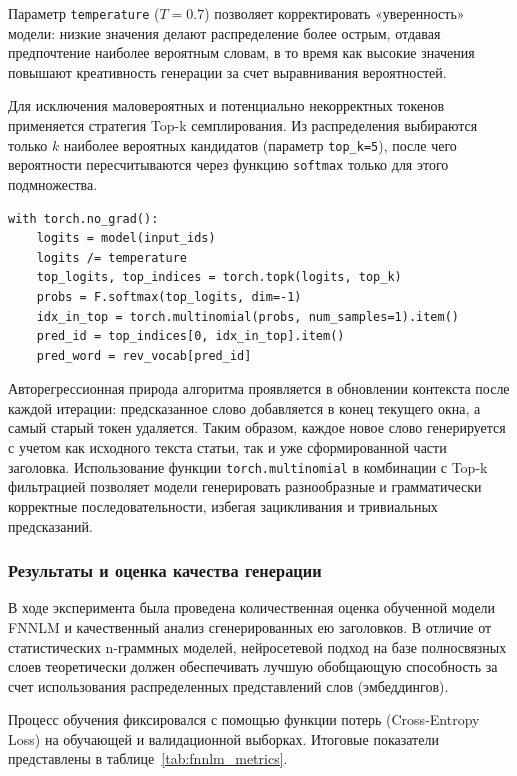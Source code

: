 \documentclass[coursework]{SCWorks}
\begin{document}
    Параметр \texttt{temperature} ($T=0.7$) позволяет корректировать «уверенность» модели: низкие значения делают распределение более острым, отдавая предпочтение наиболее вероятным словам, в то время как высокие значения повышают креативность генерации за счет выравнивания вероятностей.

    Для исключения маловероятных и потенциально некорректных токенов применяется стратегия Top-k семплирования. Из распределения выбираются только $k$ наиболее вероятных кандидатов (параметр \texttt{top\_k=5}), после чего вероятности пересчитываются через функцию \texttt{softmax} только для этого подмножества.

    \begin{verbatim}
with torch.no_grad():
    logits = model(input_ids)
    logits /= temperature
    top_logits, top_indices = torch.topk(logits, top_k)
    probs = F.softmax(top_logits, dim=-1)
    idx_in_top = torch.multinomial(probs, num_samples=1).item()
    pred_id = top_indices[0, idx_in_top].item()
    pred_word = rev_vocab[pred_id]
    \end{verbatim}

    Авторегрессионная природа алгоритма проявляется в обновлении контекста после каждой итерации: предсказанное слово добавляется в конец текущего окна, а самый старый токен удаляется. Таким образом, каждое новое слово генерируется с учетом как исходного текста статьи, так и уже сформированной части заголовка. Использование функции \texttt{torch.multinomial} в комбинации с Top-k фильтрацией позволяет модели генерировать разнообразные и грамматически корректные последовательности, избегая зацикливания и тривиальных предсказаний.

    \subsubsection{Результаты и оценка качества генерации}

    В ходе эксперимента была проведена количественная оценка обученной модели FNNLM и качественный анализ сгенерированных ею заголовков. В отличие от статистических n-граммных моделей, нейросетевой подход на базе полносвязных слоев теоретически должен обеспечивать лучшую обобщающую способность за счет использования распределенных представлений слов (эмбеддингов).

    Процесс обучения фиксировался с помощью функции потерь (Cross-Entropy Loss) на обучающей и валидационной выборках. Итоговые показатели представлены в таблице~\ref{tab:fnnlm_metrics}.
\end{document}
